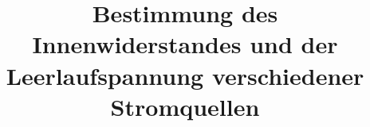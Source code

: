 

\subject{Versuch 301}
\title{Bestimmung des Innenwiderstandes und der Leerlaufspannung verschiedener
       Stromquellen}


    \maketitle
    \thispagestyle{empty}
    \tableofcontents
    \newpage
    
    
    
    
    
    \printbibliography{}
    \newpage
    

